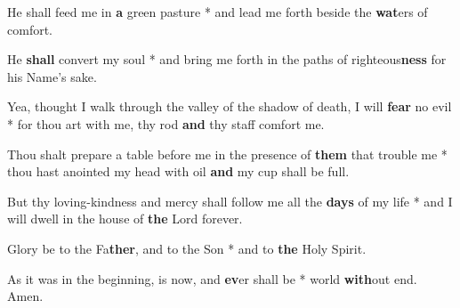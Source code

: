 \begin{multicols}{2}
	He shall feed me in \textbf{a} green pasture * and lead me forth beside the \textbf{wat}ers of comfort.
	
	He \textbf{shall} convert my soul * and bring me forth in the paths of righteous\textbf{ness} for his Name's sake.
	
	Yea, thought I walk through the valley of the shadow of death, I will \textbf{fear} no evil * for thou art with me, thy rod \textbf{and} thy staff comfort me.
	
	Thou shalt prepare a table before me in the presence of \textbf{them} that trouble me * thou hast anointed my head with oil \textbf{and} my cup shall be full.
	
	But thy loving-kindness and mercy shall follow me all the \textbf{days} of my life * and I will dwell in the house of \textbf{the} Lord forever.
	
	Glory be to the Fa\textbf{ther}, and to the Son * and to \textbf{the} Holy Spirit.
	
	As it was in the beginning, is now, and \textbf{ev}er shall be * world \textbf{with}out end. Amen.
\end{multicols}